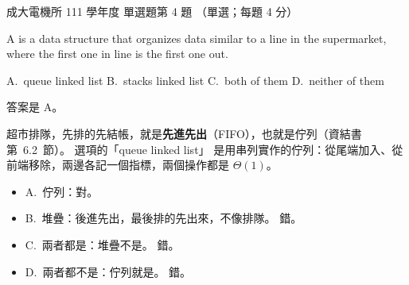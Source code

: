 \begin{pastexam}[label={px:ncku-111-ee-ds-04}]{成大電機所 111 學年度 單選題第 4 題}
（單選；每題 4 分）

A \underline{\hspace{2em}} is a data structure that organizes data similar to a line in the supermarket, where
the first one in line is the first one out.

A.~queue linked list \qquad B.~stacks linked list \qquad C.~both of them \qquad D.~neither of them
\end{pastexam}

\begin{pastsoln}
答案是 A。

超市排隊，先排的先結帳，就是\textbf{先進先出}（FIFO），也就是佇列（資結書第~6.2~節）。 選項的「queue linked list」
是用串列實作的佇列：從尾端加入、從前端移除，兩邊各記一個指標，兩個操作都是 $\Theta(1)$。
\begin{itemize}
\item A.~佇列：對。
\item B.~堆疊：後進先出，最後排的先出來，不像排隊。 錯。
\item C.~兩者都是：堆疊不是。 錯。
\item D.~兩者都不是：佇列就是。 錯。
\end{itemize}
\end{pastsoln}
